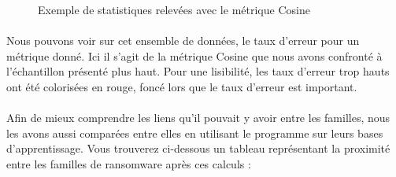 \documentclass[a4paper, 12pt]{book}
\begin{document}
\begin{figure}[!h] 	
    \caption{Exemple de statistiques relevées avec le métrique Cosine}
    \label{mCosine}
\end{figure}




\paragraph{}
Nous pouvons voir sur cet ensemble de données, le taux d’erreur pour un métrique donné. Ici il s'agit de la métrique Cosine que nous avons confronté à l'échantillon présenté plus haut. Pour une lisibilité, les taux d'erreur trop hauts ont été colorisées en rouge, foncé lors que le taux d’erreur est important.


\paragraph{}
Afin de mieux comprendre les liens qu'il pouvait y avoir entre les familles, nous les avons aussi comparées entre elles en utilisant le programme sur leurs bases d'apprentissage. Vous trouverez ci-dessous un tableau représentant la proximité entre les familles de ransomware après ces calculs :
\end{document}
